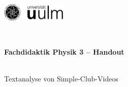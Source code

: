 \documentclass[a4paper,10pt,
headsepline,           %
oneside,               %
pointlessnumbers,      %
bibtotoc,              %
DIV=15,               %
]{scrbook}
\newcommand{\titel}{Fachdidaktik Physik 3 -- Handout}
\renewcommand{\subtitle}{Textanalyse von Simple-Club-Videos}
\begin{document}
\frontmatter

\thispagestyle{empty}
\begin{addmargin*}[8mm]{8mm}

\hfill \parbox{0.23\textwidth}{\includegraphics[width=0.23\textwidth]{./images/logo_uulm.png} }\\[4em]

\end{addmargin*}

\parbox{125mm}{\bfseries \LARGE \titel}\\[1.5em]
{\footnotesize \subtitle }\\


\renewcommand{\mainmatter}{}
\mainmatter
\end{document}
